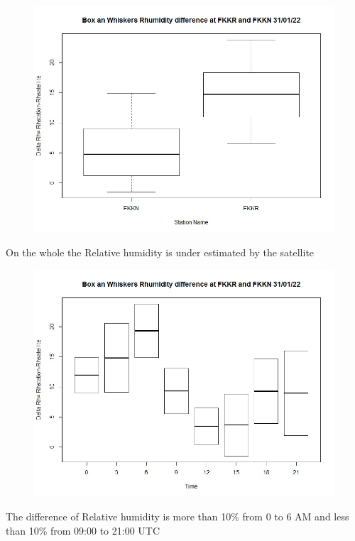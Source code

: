 \begin{figure}[H]
\begin{center}
\includegraphics[scale=0.6]{boxplotFKKNFKKRDeltaRh.jpg} %
\end{center}
\end{figure}
On the whole the Relative humidity is under estimated by the satellite
\begin{figure}[H]
\begin{center}
\includegraphics[scale=0.6]{boxplotFKKNFKKRDeltaRhtime.jpg} %
\end{center}
\end{figure}
The difference of Relative humidity is more than 10\% from 0 to 6 AM and less than 10\% from 09:00 to 21:00 UTC 


